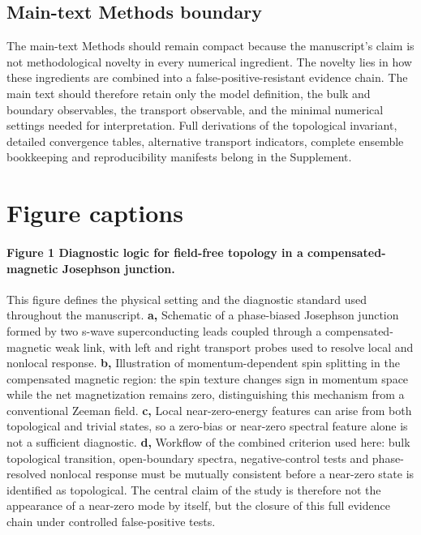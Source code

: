 \documentclass[11pt]{article}
\begin{document}
\subsection{Main-text Methods boundary}

The main-text Methods should remain compact because the manuscript's claim is not methodological novelty in every numerical ingredient. The novelty lies in how these ingredients are combined into a false-positive-resistant evidence chain. The main text should therefore retain only the model definition, the bulk and boundary observables, the transport observable, and the minimal numerical settings needed for interpretation. Full derivations of the topological invariant, detailed convergence tables, alternative transport indicators, complete ensemble bookkeeping and reproducibility manifests belong in the Supplement.

\section*{Figure captions}

\paragraph{Figure 1 \textbar{} Diagnostic logic for field-free topology in a compensated-magnetic Josephson junction.}
This figure defines the physical setting and the diagnostic standard used throughout the manuscript. \textbf{a,} Schematic of a phase-biased Josephson junction formed by two s-wave superconducting leads coupled through a compensated-magnetic weak link, with left and right transport probes used to resolve local and nonlocal response. \textbf{b,} Illustration of momentum-dependent spin splitting in the compensated magnetic region: the spin texture changes sign in momentum space while the net magnetization remains zero, distinguishing this mechanism from a conventional Zeeman field. \textbf{c,} Local near-zero-energy features can arise from both topological and trivial states, so a zero-bias or near-zero spectral feature alone is not a sufficient diagnostic. \textbf{d,} Workflow of the combined criterion used here: bulk topological transition, open-boundary spectra, negative-control tests and phase-resolved nonlocal response must be mutually consistent before a near-zero state is identified as topological. The central claim of the study is therefore not the appearance of a near-zero mode by itself, but the closure of this full evidence chain under controlled false-positive tests.
\end{document}

